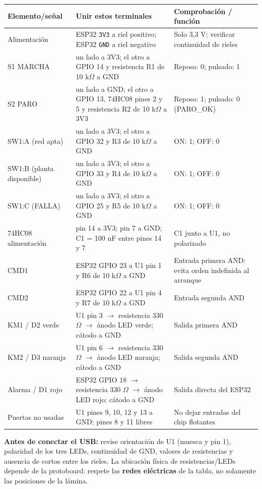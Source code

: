 \documentclass[11pt,a4paper]{article}
\newcommand{\sig}[1]{\texttt{#1}}
\begin{document}
\begin{center}\small\renewcommand{\arraystretch}{1.22}
\begin{longtable}{@{}p{3.2cm}p{5.1cm}p{6.1cm}@{}}
\toprule\textbf{Elemento/señal} & \textbf{Unir estos terminales} & \textbf{Comprobación / función}\\\midrule\endhead
Alimentación & ESP32 \sig{3V3} a riel positivo; ESP32 \sig{GND} a riel negativo & Solo 3,3 V; verificar continuidad de rieles\\
S1 MARCHA & un lado a 3V3; el otro a GPIO 14 y resistencia R1 de 10 k$\Omega$ a GND & Reposo: 0; pulsado: 1\\
S2 PARO & un lado a GND; el otro a GPIO 13, 74HC08 pines 2 y 5 y resistencia R2 de 10 k$\Omega$ a 3V3 & Reposo: 1; pulsado: 0 (PARO\_OK)\\
SW1:A (red apta) & un lado a 3V3; el otro a GPIO 32 y R3 de 10 k$\Omega$ a GND & ON: 1; OFF: 0\\
SW1:B (planta disponible) & un lado a 3V3; el otro a GPIO 33 y R4 de 10 k$\Omega$ a GND & ON: 1; OFF: 0\\
SW1:C (FALLA) & un lado a 3V3; el otro a GPIO 25 y R5 de 10 k$\Omega$ a GND & ON: 1; OFF: 0\\
74HC08 alimentación & pin 14 a 3V3; pin 7 a GND; C1 = 100 nF entre pines 14 y 7 & C1 junto a U1, no polarizado\\
CMD1 & ESP32 GPIO 23 a U1 pin 1 y R6 de 10 k$\Omega$ a GND & Entrada primera AND: evita orden indefinida al arranque\\
CMD2 & ESP32 GPIO 22 a U1 pin 4 y R7 de 10 k$\Omega$ a GND & Entrada segunda AND\\
KM1 / D2 verde & U1 pin 3 $\rightarrow$ resistencia 330 $\Omega$ $\rightarrow$ ánodo LED verde; cátodo a GND & Salida primera AND\\
KM2 / D3 naranja & U1 pin 6 $\rightarrow$ resistencia 330 $\Omega$ $\rightarrow$ ánodo LED naranja; cátodo a GND & Salida segunda AND\\
Alarma / D1 rojo & ESP32 GPIO 18 $\rightarrow$ resistencia 330 $\Omega$ $\rightarrow$ ánodo LED rojo; cátodo a GND & Salida directa del ESP32\\
Puertas no usadas & U1 pines 9, 10, 12 y 13 a GND; pines 8 y 11 libres & No dejar entradas del chip flotantes\\
\bottomrule
\end{longtable}
\end{center}

\begin{seguridad}
\textbf{Antes de conectar el USB:} revise orientación de U1 (muesca y pin 1), polaridad de los tres LEDs, continuidad de GND, valores de resistencias y ausencia de cortos entre los rieles. La ubicación física de resistencias/LEDs depende de la protoboard: respete las \textbf{redes eléctricas} de la tabla, no solamente las posiciones de la lámina.
\end{seguridad}
\end{document}
